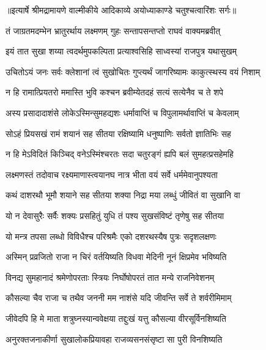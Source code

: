 {॥इत्यार्षे श्रीमद्रामायणे वाल्मीकीये आदिकाव्ये अयोध्याकाण्डे चतुश्चत्वारिंशः सर्गः॥}


\twolineshloka
{तं जाग्रतमदम्भेन भ्रातुरर्थाय लक्ष्मणम्}
{गुहः सन्तापसन्तप्तो राघवं वाक्यमब्रवीत्} %

\twolineshloka
{इयं तात सुखा शय्या त्वदर्थमुपकल्पिता}
{प्रत्याश्वसिहि साध्वस्यां राजपुत्र यथासुखम्} %

\twolineshloka
{उचितोऽयं जनः सर्वः क्लेशानां त्वं सुखोचितः}
{गुप्त्यर्थं जागरिष्यामः काकुत्स्थस्य वयं निशाम्} %

\twolineshloka
{न हि रामात्प्रियतरो ममास्ति भुवि कश्चन}
{ब्रवीम्येतदहं सत्यं सत्येनैव च ते शपे} %

\twolineshloka
{अस्य प्रसादादाशंसे लोकेऽस्मिन्सुमहद्यशः}
{धर्मावाप्तिं च विपुलामर्थावाप्तिं च केवलाम्} %

\twolineshloka
{सोऽहं प्रियसखं रामं शयानं सह सीतया}
{रक्षिष्यामि धनुष्पाणिः सर्वतो ज्ञातिभिः सह} %

\twolineshloka
{न हि मेऽविदितं किञ्चिद् वनेऽस्मिंश्चरतः सदा}
{चतुरङ्गं ह्यपि बलं सुमहत्प्रसहेमहि} %

\twolineshloka
{लक्ष्मणस्तं तदोवाच रक्ष्यमाणास्त्वयानघ}
{नात्र भीता वयं सर्वे धर्ममेवानुपश्यता} %

\twolineshloka
{कथं दाशरथौ भूमौ शयाने सह सीतया}
{शक्या निद्रा मया लब्धुं जीवितं वा सुखानि वा} %

\twolineshloka
{यो न देवासुरैः सर्वैः शक्यः प्रसहितुं युधि}
{तं पश्य सुखसंविष्टं तृणेषु सह सीतया} %

\twolineshloka
{यो मन्त्र तपसा लब्धो विविधैश्च परिश्रमैः}
{एको दशरथस्यैष पुत्रः सदृशलक्षणः} %

\twolineshloka
{अस्मिन् प्रव्रजितो राजा न चिरं वर्तयिष्यति}
{विधवा मेदिनी नूनं क्षिप्रमेव भविष्यति} %

\twolineshloka
{विनद्य सुमहानादं श्रमेणोपरताः स्त्रियः}
{निर्घोषोपरतं तात मन्ये राजनिवेशनम्} %

\twolineshloka
{कौसल्या चैव राजा च तथैव जननी मम}
{नाशंसे यदि जीवन्ति सर्वे ते शर्वरीमिमाम्} %

\twolineshloka
{जीवेदपि हि मे माता शत्रुघ्नस्यान्ववेक्षया}
{तद्दुःखं यत्तु कौसल्या वीरसूर्विनशिष्यति} %

\twolineshloka
{अनुरक्तजनाकीर्णा सुखालोकप्रियावहा}
{राजव्यसनसंसृष्टा सा पुरी विनशिष्यति} %

